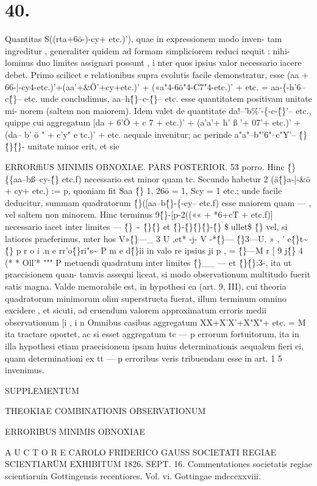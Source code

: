 \documentclass[12pt,a4paper]{article}
\begin{document}
\section*{\textbf{40.}}
Quantitas S((rta+6ö-)-cy+ etc.)'), quae in expressionem modo inven-
tam ingreditur , generaliter quidem ad formam simpliciorem reduci nequit : nihi-
lominus duo limites assignari possunt , i nter quos ipsius valor necessario iacere
debet. Primo scilicet e relationibus supra evolutis facile demonstratur, esse
(aa + 66-|-cy4-etc.)'+(aa'+\&Ö'+cy+etc.)' + («a"4-6ö"4-C7"4-etc.)' + etc.
= aa-\{-h'6--c\^\{\}-- etc.
unde concludimus, aa--h\^\{\}--c-\^\{\}-- etc. esse quantitatem positivam unitate mi-
norem (saltem non maiorem). Idem valet de quantitate da!--'b\%'-\{-c-\^\{\}'-- etc.,
quippe cui aggregatum
[da + 6'Ö + c 7 + etc.)' + (a'a'+ h' ß '+ 07'+ etc.)' + (da-- b' ö " + c'y" e tc.)' + etc.
aequale invenitur; ac perinde a"a"--b"'6"--c"Y'-- \^\{\}\^\{\}\^\{\}- unitate minor erit, et sie

\newpage
ERRORffiUS MINIMIS OBNOXIAE. PARS POSTERIOR. 53
porro. Hinc \^\{\}\{\{aa--bß--cy-\^\{\} etc.f) necessario est minor quam tc. Secundo
habetur 2 (ä\^\{\}a-|-\&ö + cy+ etc.) := p, quoniam fit Saa \^\{\} 1, 26ö = 1, Scy = 1
etc.; unde facile deducitur, summam quadratorum \^\{\}([aa--b\^\{\}-\{-cy-- etc.f)
esse maiorem quam --- , vel saltem non minorem. Hinc terminus
9\^\{\}-[p-2((«« + *6+cT + etc.f)]
necessario iacet inter limites --- \^\{\} \~{} \^\{\}\^\{\} et \^\{\}-\^\{\}\^\{\}\^\{\}-\^\{\} \$ullet\$ \^\{\} vel, si latiores praeferimus,
mter hos V»\^\{\}---\_ 3 U ,et* -j- V -*\^\{\}--- \^\{\}3---U. » , ' e\^\{\}t\~{} \^\{\} p r o i .n e rr'o\^\{\}ri"s\~{} P m e d\^\{\}ii in valo re ipsius ji p , = \^\{\}---M
r [ 9 j\^\{\} 4 (* * Oll'* """ P
metuendi quadratum inter limites \^\{\}\_\_ --- et \^\{\}\^\{\}:3-, ita ut praecisionem quan-
tamvis assequi liceat, si modo observationum multitudo fuerit satis magna.
Valde memorabile est, in hypothesi ea (art. 9, III), cui theoria quadratorum
minimorum olim superstructa fuerat, illum terminum omnino excidere , et sicuti,
ad eruendum valorem approximatum erroris medii observationum [i , i n Omnibus
casibus aggregatum XX+X'X'+X"X"+ etc. = M ita tractare oportet, ac si esset
aggregatum tc --- p errorum fortuitorum, ita in illa hypothesi etiam praecisionem
ipsam huius determinationis aequalem fieri ei, quam determinationi ex tt --- p
erroribus veris tribuendam esse in art. 1 5 invenimus.


\newpage
\begin{center}
\textsc{SUPPLEMENTUM}
\end{center}
THEOKIAE
COMBINATIONIS OBSERVATIONUM
\begin{center}
\textsc{ERRORIBUS MINIMIS OBNOXIAE}
\end{center}
A U C T O R E
CAROLO FRIDERICO GAUSS
SOCIETATI REGIAE SCIENTIARÜM EXHIBITUM 1826. SEPT. 16.
Commentationes societatis regiae scientiaruin Gottingensis recentiores. Vol. vi.
Gottingae mdcccxxviii.
\end{document}
